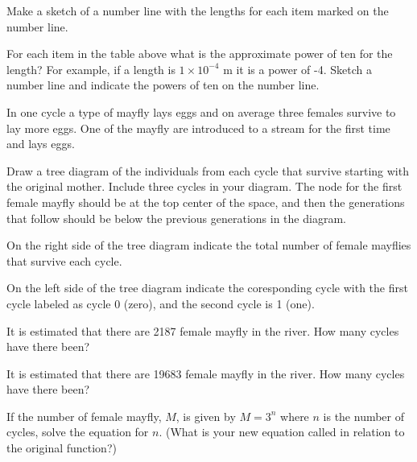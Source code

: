 \begin{problem}
  \begin{subproblem}
    \item Make a sketch of a number line with the lengths for each
      item  marked on the number line.
      \vfill
    \item For each item in the table above what is the approximate
      power of ten for the length? For example, if a length is
      $1\times 10^{-4}$ m it is a power of -4. Sketch a number line
      and indicate the powers of ten on the number line.
      \vfill
  \end{subproblem}

\clearpage

\item In one cycle a type of mayfly lays eggs and on average three
  females survive to lay more eggs. One of the mayfly are introduced
  to a stream for the first time and lays eggs.
  \begin{subproblem}
  \item Draw a tree diagram of the individuals from each cycle that
    survive starting with the original mother. Include three cycles in
    your diagram. The node for the first female mayfly should be at
    the top center of the space, and then the generations that follow
    should be below the previous generations in the diagram.  

    \vfill

  \item On the right side of the tree diagram indicate the total number
    of female mayflies that survive each cycle.
  \item On the left side of the tree diagram indicate the coresponding cycle with the
    first cycle labeled as cycle 0 (zero), and the second cycle is 1 (one).
  \item It is estimated that there are 2187 female mayfly in the river. How
    many cycles have there been?
    \vspace{3em}
  \item It is estimated that there are 19683 female mayfly in the river. How
    many cycles have there been?
    \vspace{3em}
  \item If the number of female mayfly, $M$, is given by $M=3^n$ where
    $n$ is the number of cycles, solve the equation for $n$. (What is
    your new equation called in relation to the original function?)
    \vspace{3em}
  \end{subproblem}


\end{problem}
